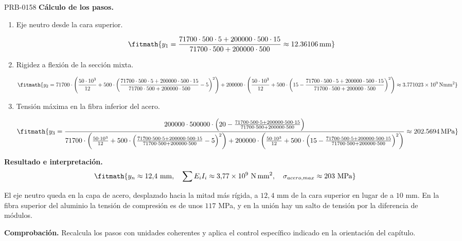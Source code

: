 \begin{studiumworked}{PRB-0158}
\textbf{Cálculo de los pasos.}

\begin{enumerate}

\item Eje neutro desde la cara superior.

\[\fitmath{y_{1}=\frac{71700\cdot 500\cdot 5+200000\cdot 500\cdot 15}{71700\cdot 500+200000\cdot 500}\approx 12.36106\,\mathrm{mm}}\]

\item Rigidez a flexión de la sección mixta.

\[\fitmath{y_{2}=71700\cdot \left(\frac{50\cdot {10}^{3}}{12}+500\cdot {\left(\frac{71700\cdot 500\cdot 5+200000\cdot 500\cdot 15}{71700\cdot 500+200000\cdot 500}-5\right)}^{2}\right)+200000\cdot \left(\frac{50\cdot {10}^{3}}{12}+500\cdot {\left(15-\frac{71700\cdot 500\cdot 5+200000\cdot 500\cdot 15}{71700\cdot 500+200000\cdot 500}\right)}^{2}\right)\approx 3.771023\times10^{9}\,\mathrm{N mm^{2}}}\]

\item Tensión máxima en la fibra inferior del acero.

\[\fitmath{y_{3}=\frac{200000\cdot 500000\cdot \left(20-\frac{71700\cdot 500\cdot 5+200000\cdot 500\cdot 15}{71700\cdot 500+200000\cdot 500}\right)}{71700\cdot \left(\frac{50\cdot {10}^{3}}{12}+500\cdot {\left(\frac{71700\cdot 500\cdot 5+200000\cdot 500\cdot 15}{71700\cdot 500+200000\cdot 500}-5\right)}^{2}\right)+200000\cdot \left(\frac{50\cdot {10}^{3}}{12}+500\cdot {\left(15-\frac{71700\cdot 500\cdot 5+200000\cdot 500\cdot 15}{71700\cdot 500+200000\cdot 500}\right)}^{2}\right)}\approx 202.5694\,\mathrm{MPa}}\]

\end{enumerate}

\textbf{Resultado e interpretación.}\[\fitmath{y_n \approx 12{,}4\ \mathrm{mm},\quad \sum E_i I_i \approx 3{,}77\times 10^{9}\ \mathrm{N\,mm^2},\quad \sigma_{acero,max} \approx 203\ \mathrm{MPa}}\]

El eje neutro queda en la capa de acero, desplazado hacia la mitad más rígida, a $12{,}4$ mm de la cara superior en lugar de a $10$ mm. En la fibra superior del aluminio la tensión de compresión es de unos $117$ MPa, y en la unión hay un salto de tensión por la diferencia de módulos.

\par\textbf{Comprobación.} Recalcula los pasos con unidades coherentes y aplica el control específico indicado en la orientación del capítulo.


\end{studiumworked}
